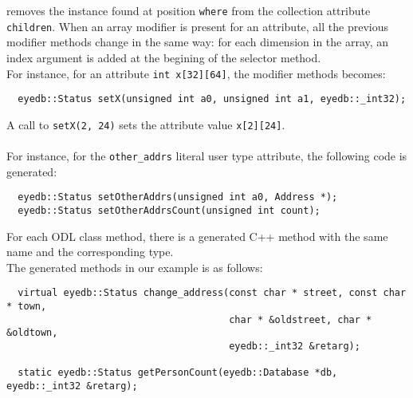 \normalsize
removes the instance found at position \texttt{where}
from the collection attribute \texttt{children}.
\ee
{}
When an array modifier is present for an attribute, all the previous
modifier methods change in the same way: for each dimension in the
array, an index argument is added at the begining of the selector method.
\\
For instance, for an attribute \texttt{int x[32][64]}, the modifier methods
becomes:
\verbsize
\begin{verbatim}
  eyedb::Status setX(unsigned int a0, unsigned int a1, eyedb::_int32);
\end{verbatim}
\normalsize
A call to \texttt{setX(2, 24)} sets the attribute value \texttt{x[2][24]}.
\\
\\
For instance,
for the \texttt{other\_addrs} literal user type attribute, the following
code is generated:
\verbsize
\begin{verbatim}
  eyedb::Status setOtherAddrs(unsigned int a0, Address *);
  eyedb::Status setOtherAddrsCount(unsigned int count);
\end{verbatim}
\normalsize
{}
For each ODL class method, there is a generated C++ method with
the same name and the corresponding type.
\\
The generated methods in our example is as follows:
\verbsize
\begin{verbatim}
  virtual eyedb::Status change_address(const char * street, const char * town,
                                       char * &oldstreet, char * &oldtown,
                                       eyedb::_int32 &retarg);

  static eyedb::Status getPersonCount(eyedb::Database *db, eyedb::_int32 &retarg);
\end{verbatim}
\normalsize


